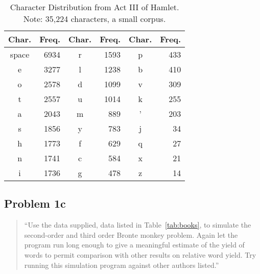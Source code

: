 \documentclass{IEEEtran}
\begin{document}
\begin{table}
\caption{\hspace{2em}Character Distribution from Act III of Hamlet. \newline
Note: 35,224 characters, a small corpus.\label{tab:hamlet}}
\vspace{-10pt}
\begin{center}
\begin{tabular}{crcrcr}
\hline
Char. & Freq. & Char. & Freq. & Char. & Freq. \\
\hline
space & 6934  & r     & 1593  & p     & 433   \\
e     & 3277  & l     & 1238  & b     & 410   \\
o     & 2578  & d     & 1099  & v     & 309   \\
t     & 2557  & u     & 1014  & k     & 255   \\
a     & 2043  & m     & 889   & '     & 203   \\
s     & 1856  & y     & 783   & j     & 34    \\
h     & 1773  & f     & 629   & q     & 27    \\
n     & 1741  & c     & 584   & x     & 21    \\
i     & 1736  & g     & 478   & z     & 14    \\
\hline
\end{tabular}
\end{center}
\end{table}


\subsection{Problem 1c}

\begin{quote}
``Use the data supplied, data listed in Table~\ref{tab:books}, to simulate the 
second-order and third order Bronte monkey problem. Again let the program run 
long enough to give a meaningful estimate of the yield of words to permit 
comparison with other results on relative word yield. Try running this 
simulation program against other authors listed.''
\end{quote}
\end{document}
